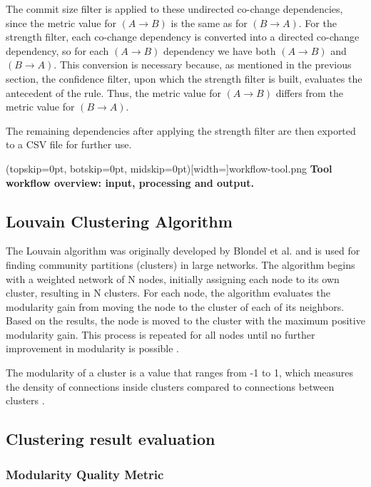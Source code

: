 \documentclass{ieeeaccess}
\begin{document}
The commit size filter is applied to these undirected co-change dependencies, since the metric value for $(A \rightarrow B)$ is the same as for $(B \rightarrow A)$. For the strength filter, each co-change dependency is converted into a directed co-change dependency, so for each $(A \rightarrow B)$ dependency we have both $(A \rightarrow B)$ and $(B \rightarrow A)$. This conversion is necessary because, as mentioned in the previous section, the confidence filter, upon which the strength filter is built, evaluates the antecedent of the rule. Thus, the metric value for $(A \rightarrow B)$ differs from the metric value for $(B \rightarrow A)$.

The remaining dependencies after applying the strength filter are then exported to a CSV file for further use.

\Figure[t!](topskip=0pt, botskip=0pt, midskip=0pt)[width=\textwidth]{workflow-tool.png}
{ \textbf{Tool workflow overview: input, processing and output.}\label{fig:tool}}

\subsection{Louvain Clustering Algorithm}
\label{subsec:louvain}

The Louvain algorithm was originally developed by Blondel et al. and is used for finding community partitions (clusters) in large networks. The algorithm begins with a weighted network of N nodes, initially assigning each node to its own cluster, resulting in N clusters. For each node, the algorithm evaluates the modularity gain from moving the node to the cluster of each of its neighbors. Based on the results, the node is moved to the cluster with the maximum positive modularity gain. This process is repeated for all nodes until no further improvement in modularity is possible \cite{b8}.

The modularity of a cluster is a value that ranges from -1 to 1, which measures the density of connections inside clusters compared to connections between clusters \cite{b9}.


\subsection{Clustering result evaluation}
\label{subsec:evaluation_def}

\subsubsection{Modularity Quality Metric}
\end{document}
